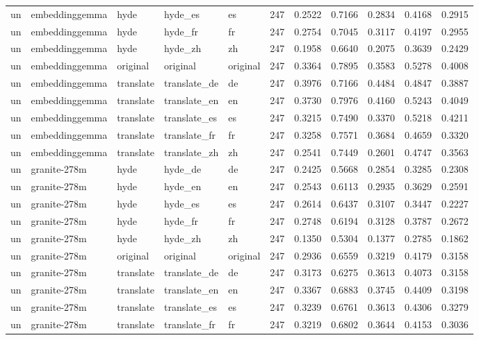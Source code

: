 \begin{tabular}{lllllrrrrrr}
un & embeddinggemma & hyde & hyde\_es & es & 247 & 0.2522 & 0.7166 & 0.2834 & 0.4168 & 0.2915 \\
un & embeddinggemma & hyde & hyde\_fr & fr & 247 & 0.2754 & 0.7045 & 0.3117 & 0.4197 & 0.2955 \\
un & embeddinggemma & hyde & hyde\_zh & zh & 247 & 0.1958 & 0.6640 & 0.2075 & 0.3639 & 0.2429 \\
un & embeddinggemma & original & original & original & 247 & 0.3364 & 0.7895 & 0.3583 & 0.5278 & 0.4008 \\
un & embeddinggemma & translate & translate\_de & de & 247 & 0.3976 & 0.7166 & 0.4484 & 0.4847 & 0.3887 \\
un & embeddinggemma & translate & translate\_en & en & 247 & 0.3730 & 0.7976 & 0.4160 & 0.5243 & 0.4049 \\
un & embeddinggemma & translate & translate\_es & es & 247 & 0.3215 & 0.7490 & 0.3370 & 0.5218 & 0.4211 \\
un & embeddinggemma & translate & translate\_fr & fr & 247 & 0.3258 & 0.7571 & 0.3684 & 0.4659 & 0.3320 \\
un & embeddinggemma & translate & translate\_zh & zh & 247 & 0.2541 & 0.7449 & 0.2601 & 0.4747 & 0.3563 \\
un & granite-278m & hyde & hyde\_de & de & 247 & 0.2425 & 0.5668 & 0.2854 & 0.3285 & 0.2308 \\
un & granite-278m & hyde & hyde\_en & en & 247 & 0.2543 & 0.6113 & 0.2935 & 0.3629 & 0.2591 \\
un & granite-278m & hyde & hyde\_es & es & 247 & 0.2614 & 0.6437 & 0.3107 & 0.3447 & 0.2227 \\
un & granite-278m & hyde & hyde\_fr & fr & 247 & 0.2748 & 0.6194 & 0.3128 & 0.3787 & 0.2672 \\
un & granite-278m & hyde & hyde\_zh & zh & 247 & 0.1350 & 0.5304 & 0.1377 & 0.2785 & 0.1862 \\
un & granite-278m & original & original & original & 247 & 0.2936 & 0.6559 & 0.3219 & 0.4179 & 0.3158 \\
un & granite-278m & translate & translate\_de & de & 247 & 0.3173 & 0.6275 & 0.3613 & 0.4073 & 0.3158 \\
un & granite-278m & translate & translate\_en & en & 247 & 0.3367 & 0.6883 & 0.3745 & 0.4409 & 0.3198 \\
un & granite-278m & translate & translate\_es & es & 247 & 0.3239 & 0.6761 & 0.3613 & 0.4306 & 0.3279 \\
un & granite-278m & translate & translate\_fr & fr & 247 & 0.3219 & 0.6802 & 0.3644 & 0.4153 & 0.3036 \\

\end{tabular}
